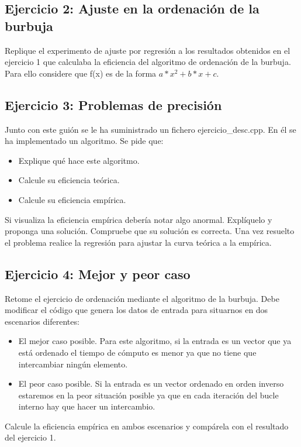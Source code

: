 \documentclass[11pt,a4paper]{article}
\begin{document}
\subsection{Ejercicio 2: Ajuste en la ordenación de la burbuja}
Replique el experimento de ajuste por regresión a los resultados obtenidos en el ejercicio 1 que calculaba la eficiencia del algoritmo de ordenación de la burbuja. Para ello considere que f(x) es de la forma $a*x^2 + b*x + c$.

\subsection{Ejercicio 3: Problemas de precisión}
Junto con este guión se le ha suministrado un fichero ejercicio\_desc.cpp. En él se ha implementado un algoritmo. Se pide que:
\begin{itemize}
	\item Explique qué hace este algoritmo.
	\item Calcule su eficiencia teórica.
	\item Calcule su eficiencia empírica.
\end{itemize}
Si visualiza la eficiencia empírica debería notar algo anormal. Explíquelo y proponga una solución. Compruebe que su solución es correcta. Una vez resuelto el problema realice la regresión para ajustar la curva teórica a la empírica.

\subsection{Ejercicio 4: Mejor y peor caso}
Retome el ejercicio de ordenación mediante el algoritmo de la burbuja. Debe modificar el código que genera los datos de entrada para situarnos en dos escenarios diferentes:
\begin{itemize}
	\item El mejor caso posible. Para este algoritmo, si la entrada es un vector que ya está ordenado el tiempo de cómputo es menor ya que no tiene que intercambiar ningún elemento.
	\item El peor caso posible. Si la entrada es un vector ordenado en orden inverso estaremos en la peor situación posible ya que en cada iteración del bucle interno hay que hacer un intercambio.
\end{itemize}
Calcule la eficiencia empírica en ambos escenarios y compárela con el resultado del
ejercicio 1.
\end{document}
